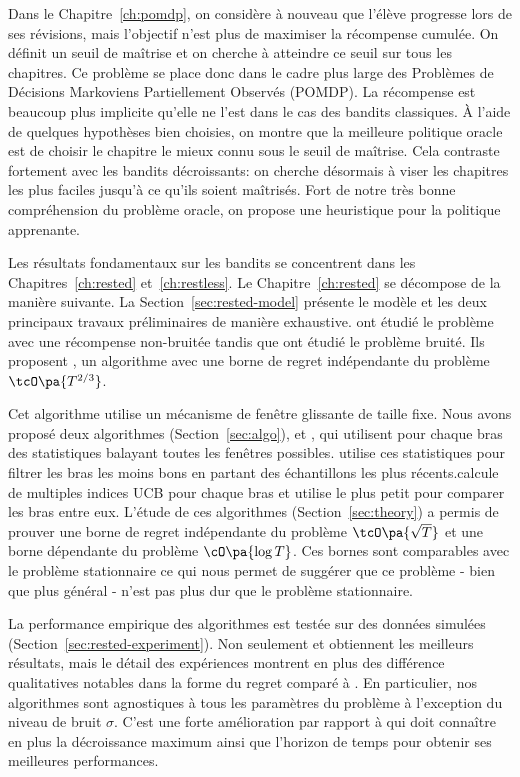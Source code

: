 Dans le Chapitre~\ref{ch:pomdp}, on considère à nouveau que l'élève progresse lors de ses révisions, mais l'objectif n'est plus de maximiser la récompense cumulée. On définit un seuil de maîtrise et on cherche à atteindre ce seuil sur tous les chapitres. Ce problème se place donc dans le cadre plus large des Problèmes de Décisions Markoviens Partiellement Observés (POMDP). La récompense est beaucoup plus implicite qu'elle ne l'est dans le cas des bandits classiques. À l'aide de quelques hypothèses bien choisies, on montre que la meilleure politique oracle est de choisir le chapitre le mieux connu sous le seuil de maîtrise. Cela contraste fortement avec les bandits décroissants: on cherche désormais à viser les chapitres les plus faciles jusqu'à ce qu'ils soient maîtrisés. Fort de notre très bonne compréhension du problème oracle, on propose une heuristique pour la politique apprenante.

Les résultats fondamentaux sur les bandits se concentrent dans les Chapitres~\ref{ch:rested} et~\ref{ch:restless}. Le Chapitre~\ref{ch:rested} se décompose de la manière suivante. La Section~\ref{sec:rested-model} présente le modèle et les deux principaux travaux préliminaires de manière exhaustive. \citet{heidari2016tight} ont étudié le problème avec une récompense non-bruitée tandis que \citet{levine2017rotting} ont étudié le problème bruité. Ils proposent \SWA, un algorithme avec une borne de regret indépendante du problème $\tcO\pa{T^{2/3}}$.

Cet algorithme utilise un mécanisme de fenêtre glissante de taille fixe. Nous avons proposé deux algorithmes (Section~\ref{sec:algo}), \FEWA et \RAWUCB, qui utilisent pour chaque bras des statistiques balayant toutes les fenêtres possibles. \FEWA utilise ces statistiques pour filtrer les bras les moins bons en partant des échantillons les plus récents.\RAWUCB calcule de multiples indices UCB pour chaque bras et utilise le plus petit pour comparer les bras entre eux. L'étude de ces algorithmes (Section~\ref{sec:theory}) a permis de prouver une borne de regret indépendante du problème $\tcO\pa{\sqrt{T}}$ et une borne dépendante du problème $\cO\pa{\log{T}}$. Ces bornes sont comparables avec le problème stationnaire ce qui nous permet de suggérer que ce problème - bien que plus général - n'est pas plus dur que le problème stationnaire. 

La performance empirique des algorithmes est testée sur des données simulées (Section~\ref{sec:rested-experiment}). Non seulement \RAWUCB et \FEWA obtiennent les meilleurs résultats, mais le détail des expériences montrent en plus des différence qualitatives notables dans la forme du regret comparé à \SWA. En particulier, nos algorithmes sont agnostiques à tous les paramètres du problème à l'exception du niveau de bruit $\sigma$. C'est une forte amélioration par rapport à \SWA qui doit connaître en plus la décroissance maximum ainsi que l'horizon de temps pour obtenir ses meilleures performances. 

